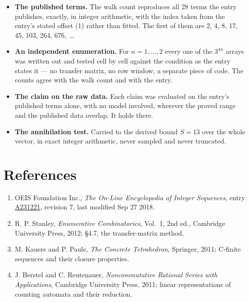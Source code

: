 \documentclass[11pt]{article}
\theoremstyle{definition}
\begin{document}
\begin{itemize}

\item {\bfseries The published terms.} The walk count reproduces all 28 terms the entry publishes, exactly, in integer arithmetic, with the index taken from the entry's stated offset (1) rather than fitted. The first of them are 2, 4, 8, 17, 45, 103, 264, 676,~\dots

\item {\bfseries An independent enumeration.} For $n = 1,\dots,2$ every one of the $3^{4n}$ arrays was written out and tested cell by cell against the condition as the entry states it --- no transfer matrix, no row window, a separate piece of code. The counts agree with the walk count and with the entry.

\item {\bfseries The claim on the raw data.} Each claim was evaluated on the entry's published terms alone, with no model involved, wherever the proved range and the published data overlap. It holds there.

\item {\bfseries The annihilation test.} Carried to the derived bound $S = 13$ over the whole vector, in exact integer arithmetic, never sampled and never truncated.

\end{itemize}

\section{References}

\begin{enumerate}

\item OEIS Foundation Inc., \emph{The On-Line Encyclopedia of Integer Sequences}, entry \href{https://oeis.org/A231221}{A231221}, revision 7, last modified Sep 27 2018.

\item R. P. Stanley, \emph{Enumerative Combinatorics}, Vol.~1, 2nd ed., Cambridge University Press, 2012; \S4.7, the transfer-matrix method.

\item M. Kauers and P. Paule, \emph{The Concrete Tetrahedron}, Springer, 2011; C-finite sequences and their closure properties.

\item J. Berstel and C. Reutenauer, \emph{Noncommutative Rational Series with Applications}, Cambridge University Press, 2011; linear representations of counting automata and their reduction.

\end{enumerate}
\end{document}
